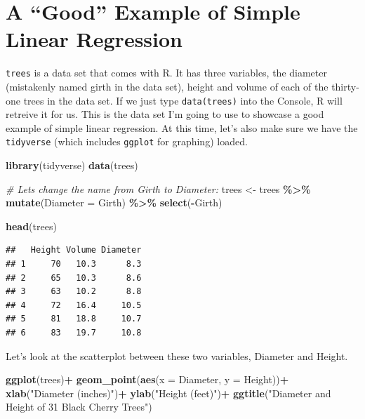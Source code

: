 \documentclass[
]{book}
\newenvironment{Shaded}{\begin{snugshade}}{\end{snugshade}}
\newcommand{\CommentTok}[1]{\textcolor[rgb]{0.56,0.35,0.01}{\textit{#1}}}
\newcommand{\DataTypeTok}[1]{\textcolor[rgb]{0.13,0.29,0.53}{#1}}
\newcommand{\KeywordTok}[1]{\textcolor[rgb]{0.13,0.29,0.53}{\textbf{#1}}}
\newcommand{\NormalTok}[1]{#1}
\newcommand{\OperatorTok}[1]{\textcolor[rgb]{0.81,0.36,0.00}{\textbf{#1}}}
\newcommand{\StringTok}[1]{\textcolor[rgb]{0.31,0.60,0.02}{#1}}
\begin{document}
\hypertarget{a-good-example-of-simple-linear-regression}{%
\section{A ``Good'' Example of Simple Linear Regression}\label{a-good-example-of-simple-linear-regression}}

\texttt{trees} is a data set that comes with R. It has three variables, the diameter (mistakenly named girth in the data set), height and volume of each of the thirty-one trees in the data set. If we just type \texttt{data(trees)} into the Console, R will retreive it for us. This is the data set I'm going to use to showcase a good example of simple linear regression. At this time, let's also make sure we have the \texttt{tidyverse} (which includes \texttt{ggplot} for graphing) loaded.

\begin{Shaded}
\begin{Highlighting}[]
\KeywordTok{library}\NormalTok{(tidyverse)}
\KeywordTok{data}\NormalTok{(trees)}

\CommentTok{\# Let\textquotesingle{}s change the name from Girth to Diameter:}
\NormalTok{trees \textless{}{-}}\StringTok{ }\NormalTok{trees }\OperatorTok{\%\textgreater{}\%}
\StringTok{  }\KeywordTok{mutate}\NormalTok{(}\DataTypeTok{Diameter =}\NormalTok{ Girth) }\OperatorTok{\%\textgreater{}\%}
\StringTok{  }\KeywordTok{select}\NormalTok{(}\OperatorTok{{-}}\NormalTok{Girth)}

\KeywordTok{head}\NormalTok{(trees)}
\end{Highlighting}
\end{Shaded}

\begin{verbatim}
##   Height Volume Diameter
## 1     70   10.3      8.3
## 2     65   10.3      8.6
## 3     63   10.2      8.8
## 4     72   16.4     10.5
## 5     81   18.8     10.7
## 6     83   19.7     10.8
\end{verbatim}

Let's look at the scatterplot between these two variables, Diameter and Height.

\begin{Shaded}
\begin{Highlighting}[]
\KeywordTok{ggplot}\NormalTok{(trees)}\OperatorTok{+}
\StringTok{  }\KeywordTok{geom\_point}\NormalTok{(}\KeywordTok{aes}\NormalTok{(}\DataTypeTok{x =}\NormalTok{ Diameter, }\DataTypeTok{y =}\NormalTok{  Height))}\OperatorTok{+}
\StringTok{  }\KeywordTok{xlab}\NormalTok{(}\StringTok{"Diameter (inches)"}\NormalTok{)}\OperatorTok{+}
\StringTok{  }\KeywordTok{ylab}\NormalTok{(}\StringTok{"Height (feet)"}\NormalTok{)}\OperatorTok{+}
\StringTok{  }\KeywordTok{ggtitle}\NormalTok{(}\StringTok{"Diameter and Height of 31 Black Cherry Trees"}\NormalTok{)}
\end{Highlighting}
\end{Shaded}
\end{document}
